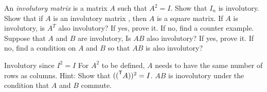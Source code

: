 
\begin{Exercise}[
name={},
title={}, 
difficulty=0,
origin={\cite{MH}}]
An \emph{involutory matrix} is a matrix $A$ such that $A^2=I$.
\Question Show that $I_n$ is involutory.
\Question Show that if $A$ is an involutory matrix , then $A$ is  a square matrix.
\Question If $A$ is involutory, is $A^T$ also involutory? If yes, prove it. If no, find a counter example.
\Question Suppose that $A$ and $B$ are involutory,
Is $AB$ also involutory? If yes, prove it. If no, find a condition on $A$ and $B$ so that $AB$ is also involutory?
\end{Exercise}
\begin{Answer}
\Question Involutory since $I^2=I$
\Question For $A^2$ to be defined, $A$ needs to have the same number of rows as columns.
\Question Hint: Show that $({{(}^{\mathsf{T}}}A))^2=I$.
\Question $AB$ is inovolutory under the condition that $A$ and $B$ commute.
\end{Answer}
